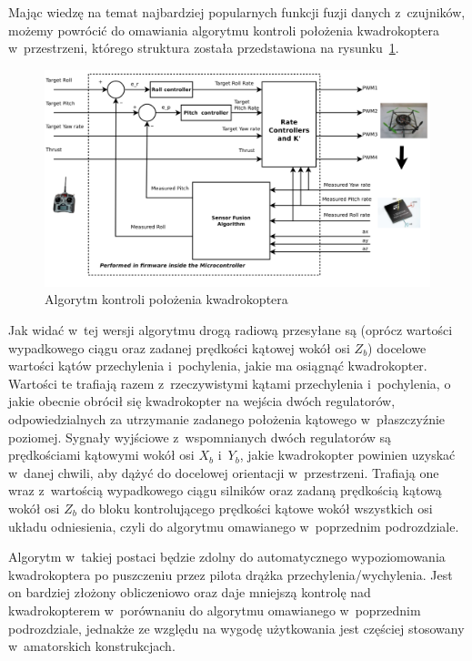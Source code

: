 Mając wiedzę na temat najbardziej popularnych funkcji fuzji danych z~czujników, możemy powrócić do omawiania algorytmu kontroli położenia kwadrokoptera w~przestrzeni, którego struktura została przedstawiona na rysunku~\ref{fig:angle_control_algorithm}.

\begin{figure}[H]
	\centering
	\includegraphics[width=1.0\textwidth]{Pictures/angle_control_algorithm.png}
		\caption[Algorytm kontroli położenia kwadrokoptera]{Algorytm kontroli położenia kwadrokoptera~\cite{quadro9}}
	\label{fig:angle_control_algorithm}
\end{figure}

Jak widać w~tej wersji algorytmu drogą radiową przesyłane są (oprócz wartości wypadkowego ciągu oraz zadanej prędkości kątowej wokół osi $Z_b$) docelowe wartości kątów przechylenia i~pochylenia, jakie ma osiągnąć kwadrokopter. Wartości te trafiają razem z~rzeczywistymi kątami przechylenia i~pochylenia, o jakie obecnie obrócił się kwadrokopter na wejścia dwóch regulatorów, odpowiedzialnych za utrzymanie zadanego położenia kątowego w~płaszczyźnie poziomej. Sygnały wyjściowe z~wspomnianych dwóch regulatorów są prędkościami kątowymi wokół osi $X_b$ i~$Y_b$, jakie kwadrokopter powinien uzyskać w~danej chwili, aby dążyć do docelowej orientacji w~przestrzeni. Trafiają one wraz z~wartością wypadkowego ciągu silników oraz zadaną prędkością kątową wokół osi $Z_b$ do bloku kontrolującego prędkości kątowe wokół wszystkich osi układu odniesienia, czyli do algorytmu omawianego w~poprzednim podrozdziale. 

Algorytm w~takiej postaci będzie zdolny do automatycznego wypoziomowania kwadrokoptera po puszczeniu przez pilota drążka przechylenia/wychylenia. Jest on bardziej złożony obliczeniowo  oraz daje mniejszą kontrolę nad kwadrokopterem w~porównaniu do algorytmu omawianego w~poprzednim podrozdziale, jednakże ze względu na wygodę użytkowania jest częściej stosowany w~amatorskich konstrukcjach.
 


